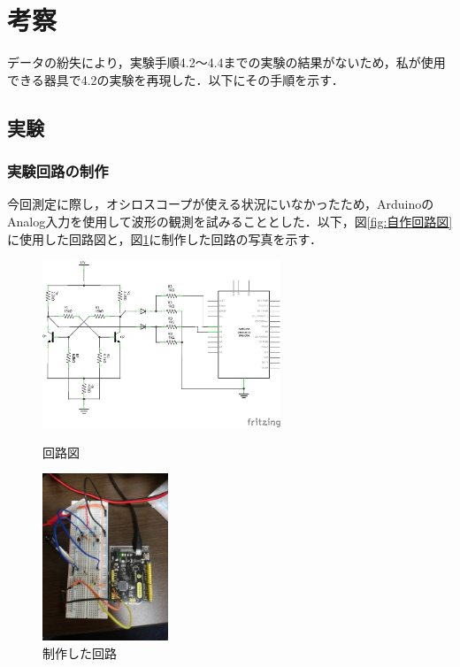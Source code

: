 \documentclass[10pt, a4j, dvipdfmx]{jarticle}
\begin{document}
    \newpage
    \section{考察}
    データの紛失により，実験手順4.2〜4.4までの実験の結果がないため，私が使用できる器具で4.2の実験を再現した．以下にその手順を示す．
    \subsection{実験}
    \subsubsection{実験回路の制作}
    今回測定に際し，オシロスコープが使える状況にいなかったため，ArduinoのAnalog入力を使用して波形の観測を試みることとした．以下，図\ref{fig:自作回路図}に使用した回路図と，図\ref{fig:自作回路写真}に制作した回路の写真を示す．
    \begin{figure}[H]
        \begin{minipage}{0.5\hsize}
            \centering
            \includegraphics[height=50mm]{images/jisaku-zu.png}
            \caption{回路図}
            \label{fig:自作回路図}
        \end{minipage}
        \begin{minipage}{0.5\hsize}
            \centering
            \includegraphics[height=50mm]{images/jisaku-syashin.jpg}
            \caption{制作した回路}
            \label{fig:自作回路写真}
        \end{minipage}
    \end{figure}
\end{document}
